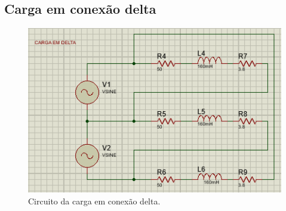 \documentclass[a4paper,12pt,oneside,openany,table,xcdraw]{article}
\begin{document}
\subsection{Carga em conexão delta}
\begin{figure}[H]
\centering
\includegraphics[width=14cm]{sim2}
\caption{Circuito da carga em conexão delta.}
\label{sim2}
\end{figure}
\end{document}
